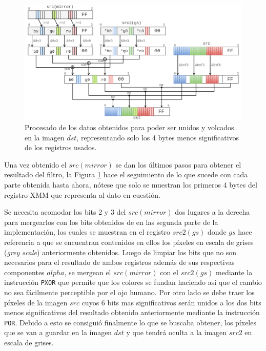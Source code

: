 \documentclass[a4paper]{article}
\begin{document}
\begin{figure}[h!]
  \begin{center}
	\includegraphics[scale=0.38]{images/filtro-ocultar-5.png}
	\caption{Procesado de los datos obtenidos para poder ser unidos y volcados en la imagen $dst$, representando solo los 4 bytes menos significativos de los registros usados.}
	\label{fig:filtro-ocultar-5}
  \end{center}
\end{figure}

Una vez obtenido el $src(mirror)$ se dan los últimos pasos para obtener el resultado del filtro, la Figura \ref{fig:filtro-ocultar-5} hace el seguimiento de lo que sucede con cada parte obtenida hasta ahora, nótese que solo se muestran los primeros 4 bytes del registro XMM que representa al dato en cuestión.


Se necesita acomodar los bits 2 y 3 del $src(mirror)$ dos lugares a la derecha para mergearlos con los bits obtenidos de en las segunda parte de la implementación, los cuales se muestran en el registro $src2(gs)$ donde $gs$ hace referencia a que se encuentran contenidos en ellos los píxeles en escala de grises (\emph{grey scale}) anteriormente obtenidos. Luego de limpiar los bits que no son necesarios para el resultado de ambos registros además de sus respectivas componentes $alpha$, se mergean el $src(mirror)$ con el $src2(gs)$ mediante la instrucción \texttt{PXOR} que permite que los colores se fundan haciendo así que el cambio no sea fácilmente perceptible por el ojo humano. Por otro lado se debe traer los píxeles de la imagen $src$ cuyos 6 bits mas significativos serán unidos a los dos bits menos significativos del resultado obtenido anteriormente mediante la instrucción \texttt{POR}. Debido a esto se consiguió finalmente lo que se buscaba obtener, los píxeles que se van a guardar en la imagen $dst$ y que tendrá oculta a la imagen $src2$ en escala de grises.
\end{document}
